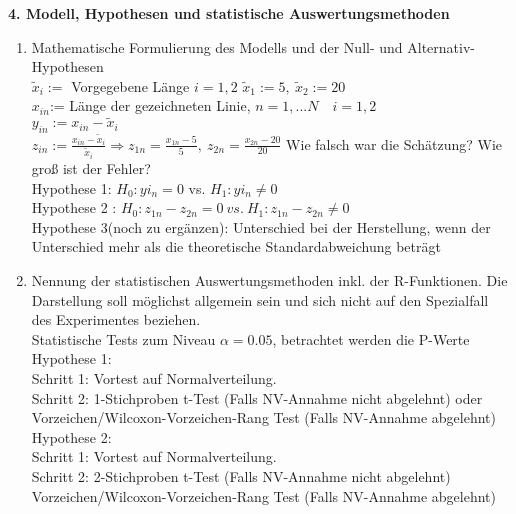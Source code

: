 \documentclass[ ngerman, fontsize= 12pt, paper=a4, headings=big, titlepage=true]{article}
\begin{document}
\textbf{4. Modell, Hypothesen und statistische Auswertungsmethoden}
\begin{enumerate}[-]
	\item  Mathematische Formulierung des Modells und der Null- und Alternativ-Hypothesen \\
	$\tilde{x}_i:=$ Vorgegebene Länge  $ i = 1,2 $
$\tilde{x}_1 := 5, \ \tilde{x}_2 := 20 $ \\
$x_{in} $:= Länge der gezeichneten Linie, $n=1, ... N \quad i=1,2 $ \\

 $ y_{in} := x_{in}- \tilde{x}_i$ \\

 $z_{in}:= \frac{x_{in} - \tilde{x}_i}{\tilde{x}_i} \Rightarrow z_{1n} = \frac{x_{1n} - 5}{5}, \ z_{2n}= \frac{x_{2n} - 20}{20} $   Wie falsch war die Schätzung? Wie groß ist der Fehler? \\

Hypothese 1: $H_0: yi_n =0 $  vs. $ H_1: yi_n \neq 0$ \\
Hypothese 2 : $H_0: z_{1n} - z_{2 n} = 0 \  vs. \ H_1:  z_{1n} - z_{2 n} \neq 0$ \\
Hypothese 3(noch zu ergänzen): Unterschied bei der Herstellung, wenn der Unterschied mehr als die theoretische Standardabweichung
beträgt \\
	\item Nennung der statistischen Auswertungsmethoden inkl. der R-Funktionen. Die Darstellung soll möglichst allgemein sein und sich nicht auf den Spezialfall des Experimentes beziehen. \\
	Statistische Tests zum Niveau $\alpha = 0.05 $, betrachtet werden die P-Werte \\
	Hypothese 1: \\
Schritt 1: Vortest auf Normalverteilung. \\
Schritt 2:
      1-Stichproben t-Test (Falls NV-Annahme nicht abgelehnt) oder \\
      Vorzeichen/Wilcoxon-Vorzeichen-Rang Test (Falls NV-Annahme abgelehnt) \\
       Hypothese 2: \\
Schritt 1: Vortest auf Normalverteilung. \\
Schritt 2:
   2-Stichproben t-Test (Falls NV-Annahme nicht abgelehnt)\\
   Vorzeichen/Wilcoxon-Vorzeichen-Rang Test (Falls NV-Annahme abgelehnt) \\
	
\end{enumerate}
\end{document}
